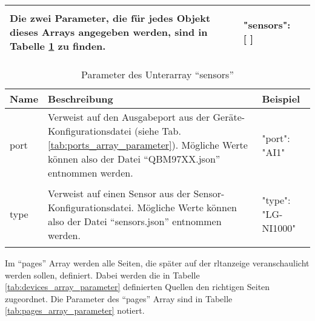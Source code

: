 \begin{enumerate}
\begin{table}[H]
\begin{tabular}{p{} p{} | p{}}
			Die zwei Parameter, die für jedes Objekt dieses Arrays angegeben werden, sind in Tabelle \ref{tab:sensors_array_parameter} zu finden. & 	
			\begin{jsonTable}
"sensors": [ ]
			\end{jsonTable}  
			\\
			\bottomrule
		\end{tabular}
	\end{table} 
	
	\begin{table}[H]
		\caption{Parameter des Unterarray \enquote{sensors}}
		\label{tab:sensors_array_parameter}
		\begin{tabular}{p{} p{} | p{}}
			\toprule
			\textbf{Name} & \textbf{Beschreibung} & \textbf{Beispiel} \\
			\midrule
			port   	& Verweist auf den Ausgabeport aus der Geräte-Konfigurationsdatei (siehe Tab. \ref{tab:ports_array_parameter}). Mögliche Werte können also \zB der Datei \enquote{QBM97XX.json} entnommen werden. & 	
			\begin{jsonTable}
"port": "AI1"
			\end{jsonTable}  
			\\
			type 	& Verweist auf einen Sensor aus der Sensor-Konfigurationsdatei. Mögliche Werte können also \zB der Datei \enquote{sensors.json} entnommen werden. & 	
			\begin{jsonTable}
"type": "LG-NI1000"
			\end{jsonTable}  
			\\
			\bottomrule
		\end{tabular}
	\end{table}
	

	Im \enquote{pages} Array werden alle Seiten, die später auf der \acs{rltanzeige} veranschaulicht werden sollen, definiert. Dabei werden die in Tabelle \ref{tab:devices_array_parameter} definierten Quellen den richtigen Seiten zugeordnet. Die Parameter des \enquote{pages} Array sind in Tabelle \ref{tab:pages_array_parameter} notiert.
	


\end{enumerate}
